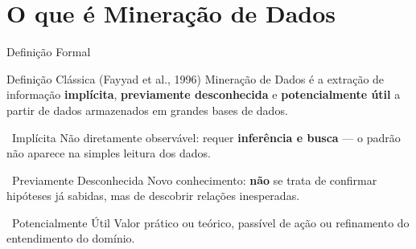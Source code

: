 \documentclass[aspectratio=169]{beamer}
\begin{document}
\section{O que é Mineração de Dados}

\begin{frame}{Definição Formal}
    \begin{block}{Definição Clássica (Fayyad et al., 1996)}
        Mineração de Dados é a extração de informação \textbf{implícita},
        \textbf{previamente desconhecida} e \textbf{potencialmente útil}
        a partir de dados armazenados em grandes bases de dados.
    \end{block}

    \vspace{0.3cm}
    \begin{block}{\faSearch\ Implícita}
        Não diretamente observável: requer \textbf{inferência e busca} — o padrão não aparece na simples leitura dos dados.
    \end{block}
    \vspace{0.2cm}
    \begin{block}{\faLightbulbO\ Previamente Desconhecida}
        Novo conhecimento: \textbf{não} se trata de confirmar hipóteses já sabidas, mas de descobrir relações inesperadas.
    \end{block}
    \vspace{0.2cm}
    \begin{block}{\faCogs\ Potencialmente Útil}
        Valor prático ou teórico, passível de ação ou refinamento do entendimento do domínio.
    \end{block}
\end{frame}
\end{document}
